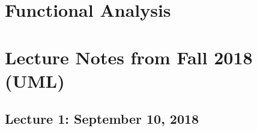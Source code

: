 \documentclass[crop=false,class=article,oneside]{standalone}
\begin{document}
    \ifx\ifmathcoursesfunctional\undefined
        \section*{Functional Analysis}
        \setcounter{section}{2}
        \renewcommand\thefigure{\arabic{section}.\arabic{figure}}
        \renewcommand\thesubfigure{%
            \arabic{section}.\arabic{figure}.\arabic{subfigure}}
    \else
        \section{Lecture Notes from Fall 2018 (UML)}
    \fi
    \subsection{Lecture 1: September 10, 2018}
\end{document}
